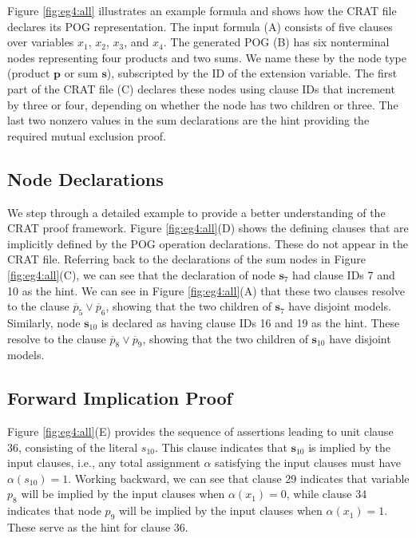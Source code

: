 \documentclass[letterpaper,USenglish,cleveref, autoref, thm-restate]{lipics-v2021}
\newcommand{\obar}[1]{\overline{#1}}
\newcommand{\assign}{\alpha}
\newcommand{\makenode}[1]{\mathbf{#1}}
\newcommand{\nodes}{\makenode{s}}
\newcommand{\nodep}{\makenode{p}}
\begin{document}
Figure \ref{fig:eg4:all} illustrates an example formula and shows how
the CRAT file declares its POG representation.  The input formula (A)
consists of five clauses over variables $x_1$, $x_2$, $x_3$, and
$x_4$.  The generated POG (B) has six nonterminal nodes representing
four products and two sums.  We name these by the node
type (product $\nodep$ or sum $\nodes$), subscripted by the ID of the
extension variable.
  The first part of the CRAT file (C) declares
these nodes using clause IDs that increment by three or four,
depending on whether the node has two children or three.  The last two
nonzero values in the sum declarations are the hint providing the
required mutual exclusion proof.

\subsection{Node Declarations}

We step through a detailed example to provide a better understanding of the CRAT proof framework.
Figure
\ref{fig:eg4:all}(D) shows the defining clauses that are implicitly
defined by the POG operation declarations.  These do not appear in the
CRAT file.  Referring back to the declarations of the sum nodes in
Figure \ref{fig:eg4:all}(C), we can see that the declaration of node
$\nodes_7$ had clause IDs 7 and 10 as the hint.  We can see in Figure
\ref{fig:eg4:all}(A) that these two clauses resolve to the clause
$\obar{p}_5 \lor \obar{p}_6$, showing that the two children of $\nodes_7$
have disjoint models.  Similarly, node $\nodes_{10}$ is declared as having
clause IDs 16 and 19 as the hint.  These resolve to the clause
$\obar{p}_8 \lor \obar{p}_9$, showing that the two children of
$\nodes_{10}$ have disjoint models.

\subsection{Forward Implication Proof}

Figure \ref{fig:eg4:all}(E) provides the sequence of assertions
leading to unit clause 36, consisting of the literal $s_{10}$.  This clause indicates that $\nodes_{10}$ is implied by the input clauses, i.e.,
any total assignment $\assign$
satisfying the input clauses must have $\assign(s_{10}) = 1$.
Working backward, we can see that
clause 29 indicates that variable $p_8$ will be implied by the input
clauses when $\assign(x_1) = 0$, while clause 34 indicates that node $p_9$ will
be implied by the input clauses when $\assign(x_1) = 1$.  These serve as the
hint for clause 36.
\end{document}
